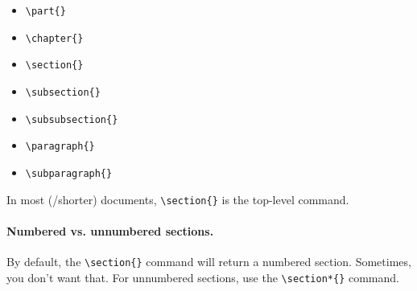 \documentclass[11pt]{article}
\begin{document}
\begin{itemize}[noitemsep]
    \item \verb|\part{}|
    \item \verb|\chapter{}|
    \item \verb|\section{}|
    \item \verb|\subsection{}|
    \item \verb|\subsubsection{}|
    \item \verb|\paragraph{}|
    \item \verb|\subparagraph{}|
\end{itemize}

\noindent In most (/shorter) documents, \verb|\section{}| is the top-level command.

\paragraph{Numbered vs. unnumbered sections.} By default, the \verb|\section{}| command will return a numbered section. Sometimes, you don't want that. For unnumbered sections, use the \verb|\section*{}| command.
\end{document}
